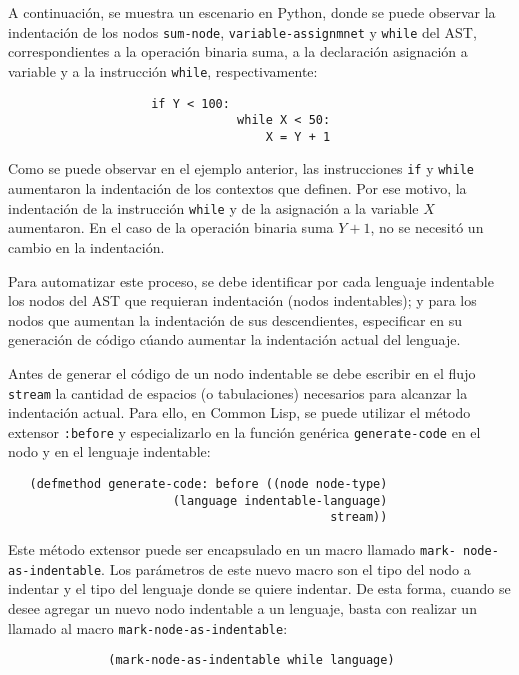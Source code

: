 A continuación, se muestra un escenario en Python, donde se puede observar la indentación de los nodos \texttt{sum-node}, \texttt{variable-assignmnet} y \texttt{while} del AST, correspondientes a la operación binaria suma, a la declaración asignación a variable y a la instrucción \texttt{while}, respectivamente:

\begin{verbatim}
                    if Y < 100:
		                        while X < 50:
		                            X = Y + 1
\end{verbatim}


Como se puede observar en el ejemplo anterior, las instrucciones \texttt{if} y \texttt{while} aumentaron la indentación de los contextos que definen. Por ese motivo, la indentación de la instrucción \texttt{while} y de la asignación a la variable $X$ aumentaron. En el caso de la operación binaria suma $Y+1$, no se necesitó un cambio en la indentación.

Para automatizar este proceso, se debe identificar por cada lenguaje indentable los nodos del AST que requieran indentación (nodos indentables); y para los nodos que aumentan la indentación de sus descendientes, especificar en su generación de código cúando aumentar la indentación actual del lenguaje.

Antes de generar el código de un nodo indentable se debe escribir en el flujo \texttt{stream} la cantidad de espacios (o tabulaciones) necesarios para alcanzar la indentación actual. Para ello, en Common Lisp, se puede utilizar el método extensor \texttt{:before} y especializarlo en la función genérica \texttt{generate-code} en el nodo y en el lenguaje indentable:
\begin{verbatim}
   (defmethod generate-code: before ((node node-type) 
                       (language indentable-language)
                                             stream))      
\end{verbatim}

Este método extensor puede ser encapsulado en un macro llamado \texttt{mark- node-as-indentable}. Los parámetros de este nuevo macro son el tipo del nodo a indentar y el tipo del lenguaje donde se quiere indentar. De esta forma, cuando se desee agregar un nuevo nodo indentable a un lenguaje, basta con realizar un llamado al macro \texttt{mark-node-as-indentable}:     
\begin{verbatim}
              (mark-node-as-indentable while language)
\end{verbatim}


